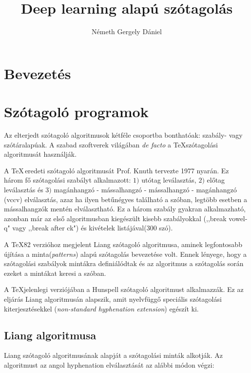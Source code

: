 \documentclass[a4paper, magyar]{article}
\title{Deep learning alapú szótagolás}
\author{N{\'e}meth Gergely D{\'a}niel}
\date{}
\begin{document}
\selectfont
\maketitle



\begin{abstract}

\end{abstract}
\begin{abstract}
	
\end{abstract}

\section{Bevezetés}
\section{Szótagoló programok}
Az elterjedt szótagoló algoritmusok kétféle csoportba bonthatóak: szabály- vagy szótáralapúak. A szabad szoftverek világában \textit{de facto} a \TeX szótagolási algoritmusát használják.

A \TeX\,eredeti szótagoló algoritmusát Prof. Knuth tervezte 1977 nyarán\cite{knuth1979tex}. Ez három fő szótagolási szabályt alkalmazott: $1)$ utótag leválasztás, $2)$ előtag leválasztás és $3)$ magánhangzó - mássalhangzó - mássalhangzó - magánhangzó (vccv) elválasztás, azaz ha ilyen betűnégyes található a szóban, legtöbb esetben a mássalhangzók mentén elválasztható. Ez a három szabály gyakran alkalmazható, azonban már az első algoritmusban kiegészült kisebb szabályokkal (,,break vowel-q" vagy ,,break after ck") és kivételek listájával(300 szó).

A \TeX82 verzióhoz megjelent Liang szótagoló algoritmusa\cite{liang1983word}, aminek legfontosabb újítása a minta(\textit{patterns}) alapú szótagolás bevezetése volt. Ennek lényege, hogy a szótagolási szabályok mintákra definiálódtak és az algoritmus a szótagolás során ezeket a mintákat keresi a szóban.

A \TeX jelenlegi verziójában a Hunspell szótagoló algoritmust alkalmazzák\cite{nemeth2006automatic}. Ez az eljárás Liang algoritmusán alapszik, amit nyelvfüggő speciális szótagolási kiterjesztésekkel (\textit{non-standard hyphenation extension}) egészít ki.
\subsection{Liang algoritmusa}
Liang szótagoló algoritmusának alapját a szótagolási minták alkotják\cite{liang1983word}. Az algoritmust az angol 
{\selectfont
	hyphenation%
} elválasztását az alábbi módon végzi:
\end{document}
